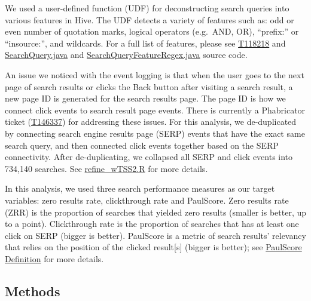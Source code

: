 \documentclass[12pt,]{article}
\begin{document}
We used a user-defined function (UDF) for deconstructing search queries
into various features in Hive. The UDF detects a variety of features
such as: odd or even number of quotation marks, logical operators
(e.g.~AND, OR), ``prefix:'' or ``insource:'', and wildcards. For a full
list of features, please see
\href{https://phabricator.wikimedia.org/T118218}{T118218} and
\href{https://git.wikimedia.org/blob/analytics\%2Frefinery\%2Fsource.git/master/refinery-core\%2Fsrc\%2Fmain\%2Fjava\%2Forg\%2Fwikimedia\%2Fanalytics\%2Frefinery\%2Fcore\%2FSearchQuery.java}{SearchQuery.java}
and
\href{https://git.wikimedia.org/blob/analytics\%2Frefinery\%2Fsource.git/master/refinery-core\%2Fsrc\%2Fmain\%2Fjava\%2Forg\%2Fwikimedia\%2Fanalytics\%2Frefinery\%2Fcore\%2FSearchQueryFeatureRegex.java}{SearchQueryFeatureRegex.java}
source code.

An issue we noticed with the event logging is that when the user goes to
the next page of search results or clicks the Back button after visiting
a search result, a new page ID is generated for the search results page.
The page ID is how we connect click events to search result page events.
There is currently a Phabricator ticket
(\href{https://phabricator.wikimedia.org/T146337}{T146337}) for
addressing these issues. For this analysis, we de-duplicated by
connecting search engine results page (SERP) events that have the exact
same search query, and then connected click events together based on the
SERP connectivity. After de-duplicating, we collapsed all SERP and click
events into 734,140 searches. See
\href{https://github.com/wikimedia-research/Discovery-Search-QueryFeatures-201610/blob/master/refine_wTSS2.R}{refine\_wTSS2.R}
for more details.

In this analysis, we used three search performance measures as our
target variables: zero results rate, clickthrough rate and PaulScore.
Zero results rate (ZRR) is the proportion of searches that yielded zero
results (smaller is better, up to a point). Clickthrough rate is the
proportion of searches that has at least one click on SERP (bigger is
better). PaulScore is a metric of search results' relevancy that relies
on the position of the clicked result{[}s{]} (bigger is better); see
\href{https://wikimedia-research.github.io/Discovery-Search-Test-BM25/\#paulscore-definition}{PaulScore
Definition} for more details.

\subsection{Methods}\label{methods}
\end{document}
